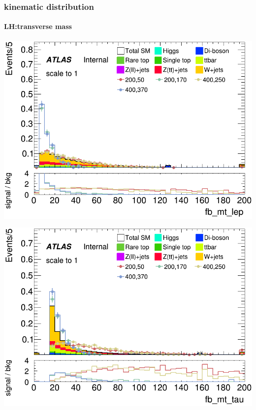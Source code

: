 \documentclass[usenames,dvipsnames]{beamer}
\begin{document}
\begin{frame}
	\frametitle{kinematic distribution}
	\framesubtitle{LH:transverse mass}
	    \begin{minipage}{0.25\textwidth}
        \centering
        \includegraphics[width=\textwidth]{graphics/LH_met_sig/LH_fb_mt_lep_norm.png}
    \end{minipage}
    \hfill
    \begin{minipage}{0.25\textwidth}
        \centering
        \includegraphics[width=\textwidth]{graphics/LH_met_sig/LH_fb_mt_tau_norm.png}
    \end{minipage}
    \hfill
    \begin{minipage}{0.25\textwidth}
        \centering

\end{minipage}
\end{frame}
\end{document}
